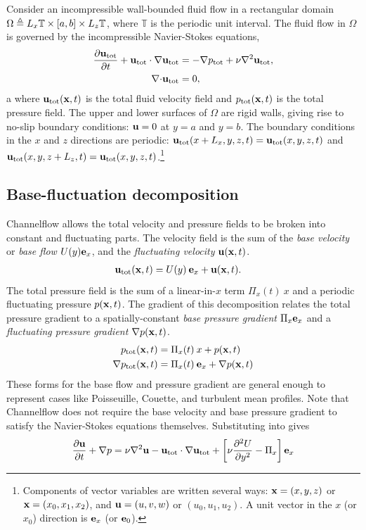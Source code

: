 \documentclass{article}[12pt]
\begin{document}
Consider an incompressible wall-bounded fluid flow in a rectangular
domain $\Omega \triangleq L_x \mathbb{T} \times [a, b] \times L_z \mathbb{T}$,
where $\mathbb{T}$ is the periodic unit interval. The fluid flow in
$\Omega$ is governed by the incompressible Navier-Stokes equations,
\begin{align}
\frac{\partial {\bf u}_{\text{tot}}}{\partial t} + {\bf u}_{\text{tot}} \cdot {\bf \nabla} {\bf u}_{\text{tot}} & = -  {\bf \nabla} p_{\text{tot}} + \nu \nabla^2 {\bf u}_{\text{tot}} \label{NS0a} ,\\
{\bf \nabla \cdot} {\bf u}_{\text{tot}} & = 0, \label{NS0b}
\end{align}a
where ${\bf u}_{\text{tot}}({\bf x},t)$ is the total fluid velocity field and
$p_{\text{tot}}({\bf x},t)$ is the total pressure field. The upper and lower
surfaces of $\Omega$ are rigid walls, giving rise to no-slip boundary
conditions: ${\bf u} = 0$ at $y=a$ and $y=b$. The boundary conditions in
the $x$ and $z$ directions are periodic: ${\bf u}_{\text{tot}}(x+L_x,y,z,t) =
{\bf u}_{\text{tot}}(x,y,z,t)$ and ${\bf u}_{\text{tot}}(x,y,z+L_z,t) =
{\bf u}_{\text{tot}}(x,y,z,t)$.\footnote{Components of vector variables are written
several ways: ${\bf x} = (x,y,z)$ or ${\bf x}=(x_0,x_1,x_2)$, and ${\bf u} = (u,v,w)$
or $(u_0, u_1, u_2)$. A unit vector in the $x$ (or $x_0$) direction is
${\bf e}_x$ (or ${\bf e}_0$).}

\subsection{Base-fluctuation decomposition}
\label{sec:basefluc}

Channelflow allows the total velocity and pressure fields to be broken
into constant and fluctuating parts. The velocity field is the sum of
the {\em base velocity} or {\em base flow} $U(y) {\bf e}_x$, and the
{\em fluctuating velocity} ${\bf u}({\bf x},t)$.
\begin{align}
{\bf u}_{\text{tot}}({\bf x},t) &= U(y)\: {\bf e}_x + {\bf u}({\bf x},t). \label{eqn:udecomp}
\end{align}
The total pressure field is the sum of a linear-in-$x$ term $\Pi_x(t)
\: x$ and a periodic fluctuating pressure $p({\bf x},t)$. The gradient of
this decomposition relates the total pressure gradient to a
spatially-constant {\em base pressure gradient} $\Pi_x {\bf e}_x$ and a
{\em fluctuating pressure gradient} ${\bf \nabla} p({\bf x},t)$.
\begin{align}
p_{\text{tot}}({\bf x},t)  &= \Pi_x(t)\: x + p({\bf x},t) \\
{\bf \nabla} p_{\text{tot}}({\bf x},t)  &= \Pi_x(t) \:{\bf e}_x + {\bf \nabla} p({\bf x},t) \label{eqn:gradpdecomp}
\end{align}
These forms for the base flow and pressure gradient are general enough
to represent cases like Poisseuille, Couette, and turbulent
mean profiles. Note that Channelflow does not require the base velocity
and base pressure gradient to satisfy the Navier-Stokes equations themselves.
Substituting  into  gives
\begin{align}
\frac{\partial {\bf u}}{\partial t} +  {\bf \nabla} p = \nu \nabla^2 {\bf u} - {\bf u}_{\text{tot}} \cdot {\bf \nabla} {\bf u}_{\text{tot}} + \left[\nu  \frac{\partial^2 U}{\partial y^2} - \Pi_x \right] {\bf e}_x \label{NS1a}
\end{align}
\end{document}

